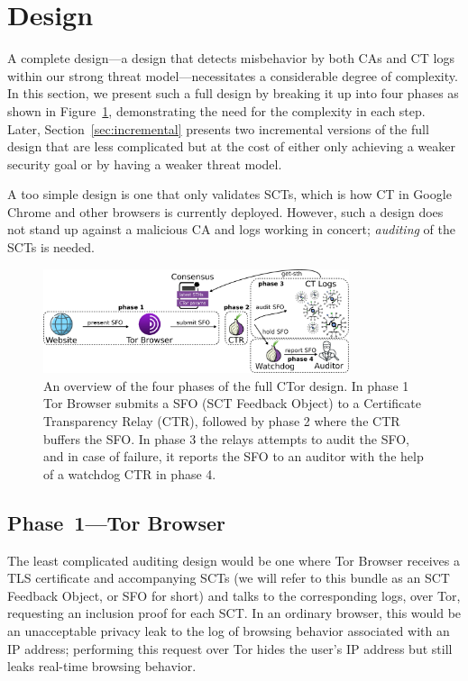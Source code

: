 \section{Design} \label{sec:base}

A complete design---a design that detects misbehavior by both CAs and CT logs
within our strong threat model---necessitates a considerable degree of
complexity. In this section, we present such a full design by breaking it up
into four phases as shown in Figure~\ref{fig:design}, demonstrating the need for
the complexity in each step. Later, Section~\ref{sec:incremental} presents two
incremental versions of the full design that are less complicated but at the
cost of either only achieving a weaker security goal or by having a weaker
threat model.

A too simple design is one that only validates SCTs, which is how CT in Google
Chrome and other browsers is currently deployed. However, such a design does not
stand up against a malicious CA and logs working in concert; \emph{auditing} of
the SCTs is needed.

\begin{figure}
    \centering
	\includegraphics[width=0.8\textwidth]{img/design}
	\vspace{-8px}
	\caption{%
		An overview of the four phases of the full CTor design. In phase 1 Tor
	Browser submits a SFO (SCT Feedback Object) to a Certificate Transparency
	Relay (CTR), followed by phase 2 where the CTR buffers the SFO. In phase 3
	the relays attempts to audit the SFO, and in case of failure, it reports the
	SFO to an auditor with the help of a watchdog CTR in phase 4.}
	\label{fig:design}
	\vspace{-10px}
\end{figure}

\subsection{Phase~1---Tor Browser} \label{sec:base:phase1}

The least complicated auditing design would be one where Tor Browser receives a
TLS certificate and accompanying SCTs (we will refer to this bundle as an SCT
Feedback Object, or SFO for short) and talks to the corresponding logs, over
Tor, requesting an inclusion proof for each SCT. In an ordinary browser, this
would be an unacceptable privacy leak to the log of browsing behavior associated
with an IP address; performing this request over Tor hides the user's IP address
but still leaks real-time browsing behavior.

